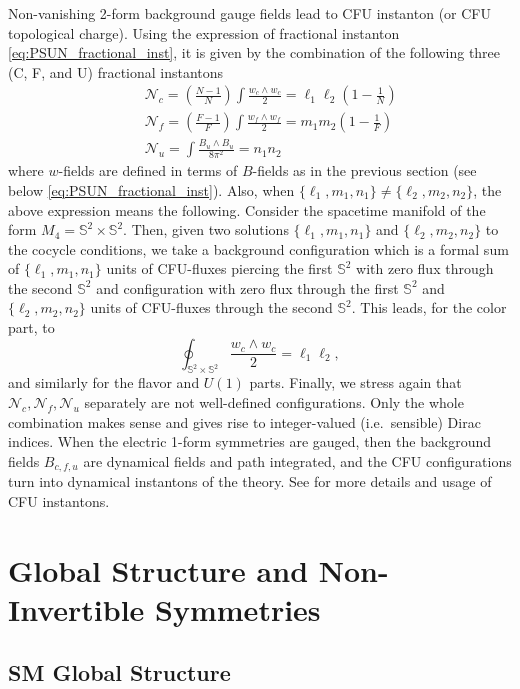\documentclass[11pt,a4paper]{article}
\def\beq{\begin{equation}}
\def\eeq{\end{equation}}
\def\bea{\begin{eqnarray}}
\def\eea{\end{eqnarray}}
\begin{document}
Non-vanishing 2-form background gauge fields lead to CFU instanton (or CFU topological charge). Using the expression of fractional instanton \eqref{eq:PSUN_fractional_inst}, it is given by the combination of the following three (C, F, and U) fractional instantons
%
\bea
&& \mathcal{N}_c = \left( \frac{N-1}{N} \right) \int \frac{w_c \wedge w_c}{2} = \ell_1 \ell_2 \left( 1 - \frac{1}{N} \right) \\
&& \mathcal{N}_f = \left( \frac{F-1}{F} \right) \int \frac{w_f \wedge w_f}{2} = m_1 m_2 \left( 1 - \frac{1}{F} \right)  \\
&& \mathcal{N}_u = \int \frac{B_u \wedge B_u}{8\pi^2} = n_1 n_2 
\eea 
%
where $w$-fields are defined in terms of $B$-fields as in the previous section (see below \eqref{eq:PSUN_fractional_inst}). Also, when $\{ \ell_1, m_1, n_1 \} \neq \{ \ell_2, m_2, n_2 \}$, the above expression means the following. Consider the spacetime manifold of the form $M_4 = \mathbb{S}^2 \times \mathbb{S}^2$. Then, given two solutions $\{ \ell_1, m_1, n_1 \}$ and $\{ \ell_2, m_2, n_2 \}$ to the cocycle conditions, we take a background configuration which is a formal sum of $\{ \ell_1, m_1, n_1 \}$ units of CFU-fluxes piercing the first $\mathbb{S}^2$ with zero flux through the second $\mathbb{S}^2$ and configuration with zero flux through the first $\mathbb{S}^2$ and $\{ \ell_2, m_2, n_2 \}$ units of CFU-fluxes through the second $\mathbb{S}^2$. This leads, for the color part, to 
%
\beq
\oint_{\mathbb{S}^2 \times \mathbb{S}^2} \frac{w_c \wedge w_c}{2} = \ell_1 \ell_2,
\eeq
%
and similarly for the flavor and $U(1)$ parts.
Finally, we stress again that $\mathcal{N}_c, \mathcal{N}_f, \mathcal{N}_u$ separately are not well-defined configurations. Only the whole combination makes sense and gives rise to integer-valued (i.e.~sensible) Dirac indices. When the electric 1-form symmetries are gauged, then the background fields $B_{c,f,u}$ are dynamical fields and path integrated, and the CFU configurations turn into dynamical instantons of the theory. See \cite{Anber:2021iip} for more details and usage of CFU instantons. 

\section{Global Structure and Non-Invertible Symmetries} \label{app:globalStructure}

\subsection{SM Global Structure}
\end{document}
